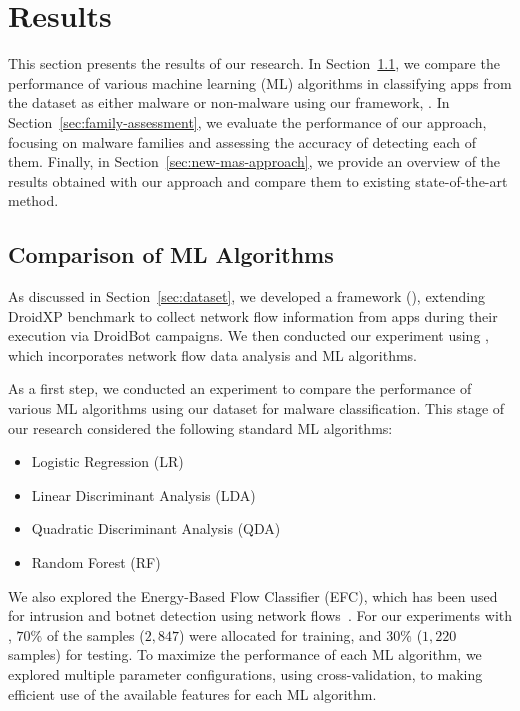 \section{Results}\label{sec:results}

This section presents the results of our research. In Section~\ref{sec:ml}, we compare the performance of various machine learning (ML) algorithms in classifying apps from the \fds dataset as either malware or non-malware using our framework, \droidxpflow. In Section~\ref{sec:family-assessment}, we evaluate the performance of our approach, focusing on malware families and assessing the accuracy of detecting each of them. Finally, in Section~\ref{sec:new-mas-approach}, we provide an overview of the results obtained with our approach and compare them to existing state-of-the-art method.



\subsection{Comparison of ML Algorithms}\label{sec:ml}

As discussed in Section~\ref{sec:dataset}, we developed a framework (\droidxpflow), extending DroidXP benchmark to collect network flow information from apps during their execution via DroidBot campaigns. We then conducted our experiment using \droidxpflow, which incorporates network flow data analysis and ML algorithms.

As a first step, we conducted an experiment to compare the performance of various ML algorithms using our \fds dataset for malware classification. This stage of our research considered the following standard ML algorithms:

\begin{itemize}
 \item Logistic Regression (LR)
 \item Linear Discriminant Analysis (LDA)
 \item Quadratic Discriminant Analysis (QDA)
 \item Random Forest (RF)
\end{itemize}

We also explored the Energy-Based Flow Classifier (EFC), which has been used for intrusion and botnet detection using network flows~\cite{DBLP:journals/tnsm/PontesSGBM21}. For our experiments with \fds, $70\%$ of the samples ($2,847$) were allocated for training, and $30\%$ ($1,220$ samples) for testing. To maximize the performance of each ML algorithm, we explored multiple parameter configurations, using cross-validation, to making efficient use of the available features for each ML algorithm.

